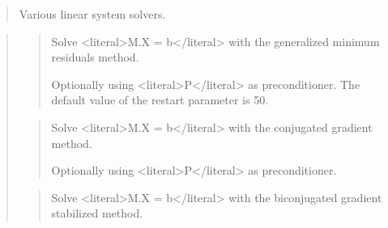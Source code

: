 \documentclass[a4paper,11pt,english]{sphinxmanual}
\begin{document}
\sphinxAtStartPar
{}
\begin{quote}

\sphinxAtStartPar
Various linear system solvers.
\end{quote}

\sphinxAtStartPar
{}
\begin{quote}

\sphinxAtStartPar
{}
\begin{quote}

\sphinxAtStartPar
Solve \textless{}literal\textgreater{}M.X = b\textless{}/literal\textgreater{} with the generalized minimum residuals method.

\sphinxAtStartPar
Optionally using \textless{}literal\textgreater{}P\textless{}/literal\textgreater{} as preconditioner. The default value of the
restart parameter is 50.
\end{quote}

\sphinxAtStartPar
{}
\begin{quote}

\sphinxAtStartPar
Solve \textless{}literal\textgreater{}M.X = b\textless{}/literal\textgreater{} with the conjugated gradient method.

\sphinxAtStartPar
Optionally using \textless{}literal\textgreater{}P\textless{}/literal\textgreater{} as preconditioner.
\end{quote}

\sphinxAtStartPar
{}
\begin{quote}

\sphinxAtStartPar
Solve \textless{}literal\textgreater{}M.X = b\textless{}/literal\textgreater{} with the bi\sphinxhyphen{}conjugated gradient stabilized method.


\end{quote}
\end{quote}
\end{document}
